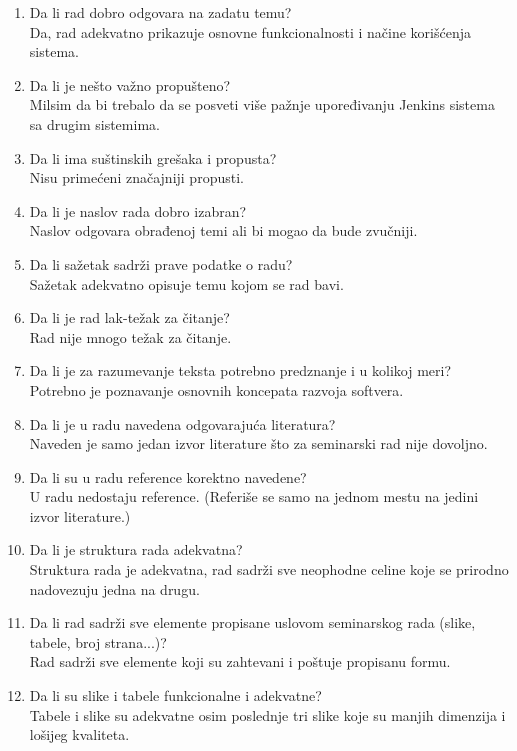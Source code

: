 \documentclass[a4paper]{report}
\begin{document}
\begin{enumerate}
\item Da li rad dobro odgovara na zadatu temu?\\
Da, rad adekvatno prikazuje osnovne funkcionalnosti i načine korišćenja sistema.
\item Da li je nešto važno propušteno?\\
Milsim da bi trebalo da se posveti više pažnje upoređivanju Jenkins sistema sa drugim sistemima.
\item Da li ima suštinskih grešaka i propusta?\\
Nisu primećeni značajniji propusti.
\item Da li je naslov rada dobro izabran?\\
Naslov odgovara obrađenoj temi ali bi mogao da bude zvučniji.
\item Da li sažetak sadrži prave podatke o radu?\\
Sažetak adekvatno opisuje temu kojom se rad bavi.
\item Da li je rad lak-težak za čitanje?\\
Rad nije mnogo težak za čitanje.
\item Da li je za razumevanje teksta potrebno predznanje i u kolikoj meri?\\
Potrebno je poznavanje osnovnih koncepata razvoja softvera.
\item Da li je u radu navedena odgovarajuća literatura?\\
Naveden je samo jedan izvor literature što za seminarski rad nije dovoljno.
\item Da li su u radu reference korektno navedene?\\
U radu nedostaju reference. (Referiše se samo na jednom mestu na jedini izvor literature.)
\item Da li je struktura rada adekvatna?\\
Struktura rada je adekvatna, rad sadrži sve neophodne celine koje se prirodno nadovezuju jedna na drugu.
\item Da li rad sadrži sve elemente propisane uslovom seminarskog rada (slike, tabele, broj strana...)?\\
Rad sadrži sve elemente koji su zahtevani i poštuje propisanu formu.
\item Da li su slike i tabele funkcionalne i adekvatne?\\
Tabele i slike su adekvatne osim poslednje tri slike koje su manjih dimenzija i lošijeg kvaliteta.
\end{enumerate}
\end{document}

